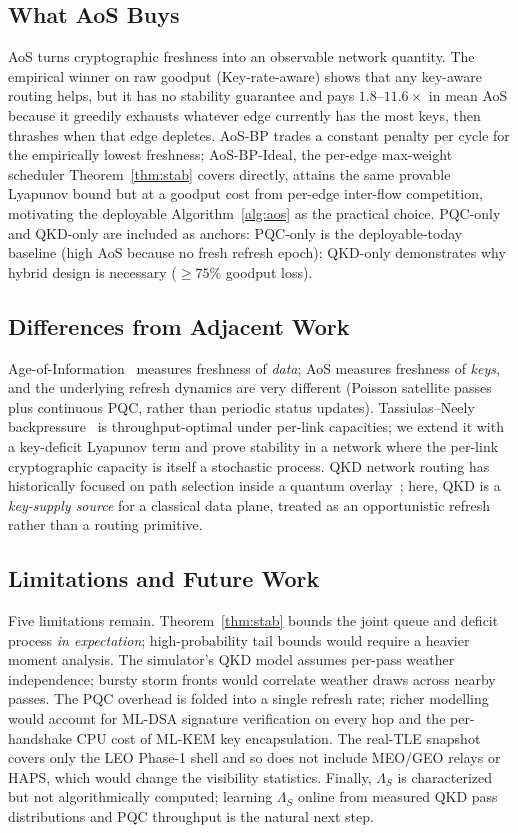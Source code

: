 \documentclass[conference]{IEEEtran}
\begin{document}
\subsection{What AoS Buys}
AoS turns cryptographic freshness into an observable network
quantity.  The empirical winner on raw goodput
(Key-rate-aware) shows that any key-aware routing helps, but it has
no stability guarantee and pays $1.8$--$11.6\times$ in mean AoS
because it greedily exhausts whatever edge currently has the most
keys, then thrashes when that edge depletes.  AoS-BP trades a
constant penalty per cycle for the empirically lowest freshness;
AoS-BP-Ideal, the per-edge max-weight scheduler Theorem~\ref{thm:stab}
covers directly, attains the same provable Lyapunov bound but at
a goodput cost from per-edge inter-flow competition, motivating the
deployable Algorithm~\ref{alg:aos} as the practical choice.  PQC-only
and QKD-only are included as anchors: PQC-only is the
deployable-today baseline (high AoS because no fresh refresh epoch);
QKD-only demonstrates why hybrid design is necessary
($\geq 75\%$ goodput loss).

\subsection{Differences from Adjacent Work}
Age-of-Information~\cite{kaul_aoi_2012} measures freshness of
\emph{data}; AoS measures freshness of \emph{keys}, and the
underlying refresh dynamics are very different (Poisson satellite
passes plus continuous PQC, rather than periodic status updates).
Tassiulas--Neely
backpressure~\cite{tassiulas_backpressure_1992,neely_book_2010} is
throughput-optimal under per-link capacities; we extend it with a
key-deficit Lyapunov term and prove stability in a network where
the per-link cryptographic capacity is itself a stochastic process.
QKD network routing has historically focused on path selection
inside a quantum overlay~\cite{pirandola_qkd_2020}; here, QKD is a
\emph{key-supply source} for a classical data plane, treated as
an opportunistic refresh rather than a routing primitive.

\subsection{Limitations and Future Work}
Five limitations remain.  Theorem~\ref{thm:stab} bounds the joint
queue and deficit process \emph{in expectation}; high-probability
tail bounds would require a heavier moment analysis.  The
simulator's QKD model assumes per-pass weather independence; bursty
storm fronts would correlate weather draws across nearby passes.
The PQC overhead is folded into a single refresh rate; richer
modelling would account for ML-DSA signature verification on every
hop and the per-handshake CPU cost of ML-KEM key encapsulation.
The real-TLE snapshot covers only the LEO Phase-1 shell and so does
not include MEO/GEO relays or HAPS, which would change the
visibility statistics.  Finally, $\Lambda_S$ is characterized but
not algorithmically computed; learning $\Lambda_S$ online from
measured QKD pass distributions and PQC throughput is the natural
next step.
\end{document}

